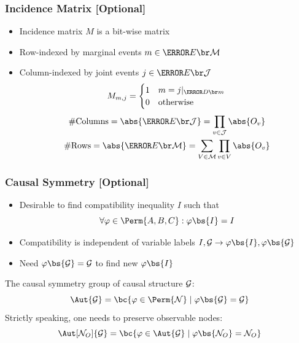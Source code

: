 \documentclass[
    hyperref={bookmarks=false},%
    xcolor={dvipsnames},
]{beamer}
\renewcommand{\term}[1]{\textcolor{Mahogany}{#1}}
\begin{document}
\begin{frame}
    \frametitle{Incidence Matrix [Optional]}
    \begin{itemize}
        \item \term{Incidence matrix} $M$ is a bit-wise matrix
        \item Row-indexed by marginal events $m \in \Events{\mscenario}$
        \item Column-indexed by joint events $j \in \Events{\jointvar}$
        \[ M_{m,j} = \begin{cases}
            1 & m = j|_{\Dom{m}} \\
            0 & \text{otherwise}
        \end{cases} \]
        \begin{gather*}
        \# \text{Columns} = \abs{\Events{\jointvar}} = \prod_{v \in \jointvar} \abs{O_{v}} \\
        \# \text{Rows} = \abs{\Events{\mscenario}} = \sum_{V \in \mscenario} \prod_{v \in V} \abs{O_{v}}
        \end{gather*}

    \end{itemize}
\end{frame}


\begin{frame}
    \frametitle{Causal Symmetry [Optional]}
    \begin{itemize}
        \item Desirable to find compatibility inequality $I$ such that
        \[ \forall \varphi \in \Perm{A,B,C} : \varphi\bs{I} = I \]
        \item Compatibility is independent of variable labels $I, \graph \to \varphi\bs{I}, \varphi\bs{\graph}$
        \item Need $\varphi\bs{\graph} = \graph$ to find new $\varphi\bs{I}$
    \end{itemize}
    \begin{definition}
        The \term{causal symmetry group} of causal structure $\mathcal{G}$:
        \[ \Aut{\graph} = \bc{\varphi \in \Perm{\nodes} \mid \varphi\bs{\graph} = \graph} \]
        Strictly speaking, one needs to preserve observable nodes:
        \[ \Aut[\nodes_O]{\graph} = \bc{\varphi \in \Aut{\graph} \mid \varphi\bs{\nodes_O} = \nodes_O} \]
    \end{definition}
\end{frame}
\end{document}
